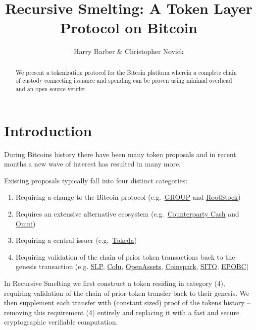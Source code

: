 \documentclass[9pt,oneside]{amsart}
\title{Recursive Smelting: A Token Layer Protocol on Bitcoin}
\author{Harry Barber \& Christopher Novick}
\begin{document}
\begin{abstract}
    We present a tokenization protocol for the Bitcoin platform wherein a complete chain of custody connecting issuance and spending can be proven using minimal overhead and an open source verifier.
\end{abstract}
\maketitle

\section{Introduction}
During Bitcoins history there have been many token proposals and in recent months a new wave of interest has resulted in many more. 

Existing proposals typically fall into four distinct categories: \begin{enumerate}
    \item Requiring a change to the Bitcoin protocol (e.g.\ \href{https://docs.google.com/document/d/1X-yrqBJNj6oGPku49krZqTMGNNEWnUJBRFjX7fJXvTs}{GROUP} and \href{https://en.wikipedia.org/wiki/RootStock}{RootStock})
    \item Requires an extensive alternative ecosystem (e.g.\ \href{https://counterparty.io/docs/protocol_specification/}{Counterparty Cash} and \href{https://github.com/OmniLayer/spec}{Omni})
    \item Requiring a central issuer (e.g.\ \href{http://media.lokad.com/bitcoin/tokeda-2018-04-30.pdf}{Tokeda})
    \item Requiring validation of the chain of prior token transactions back to the genesis transaction (e.g. \href{https://github.com/simpleledger/simple-ledger-protocol}{SLP}, \href{https://github.com/Colored-Coins/Colored-Coins-Protocol-Specification}{Colu}, \href{https://github.com/OpenAssets/open-assets-protocol/blob/master/specification.mediawiki}{OpenAssets}, \href{http://coinspark.org/}{Coinspark}, \href{https://github.com/awemany/sito}{SITO}, \href{https://github.com/chromaway/ngcccbase/wiki/EPOBC_simple}{EPOBC})
\end{enumerate}

In Recursive Smelting we first construct a token residing in category (4), requiring validation of the chain of prior token transfer back to their genesis. We then supplement each transfer with (constant sized) proof of the tokens history -- removing this requirement (4) entirely and replacing it with a fast and secure cryptographic verifiable computation.
\end{document}
